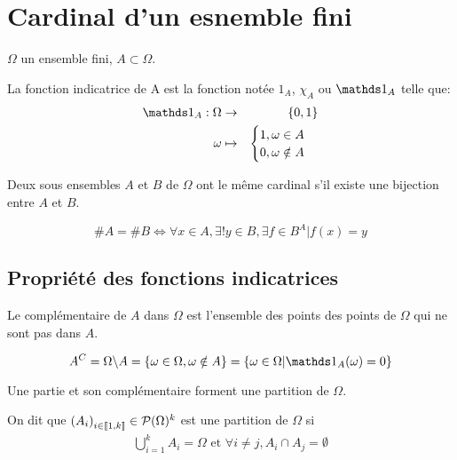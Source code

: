 \section{Cardinal d'un esnemble fini}
$\Omega$ un ensemble fini, $A\subset\Omega$.
\begin{definition}
  La fonction indicatrice de A est la fonction notée $1_A$, $\chi_A$ ou
  $\indic_A$ telle que:
  \begin{eqnarray*}
    \indic_A : \Omega &\rightarrow& \{0, 1\}\\
          \omega &\mapsto& \begin{cases}
                          1, \omega\in A\\
                          0, \omega\notin A
                        \end{cases}
  \end{eqnarray*}
\end{definition}

\begin{proposition}
  Deux sous ensembles $A$ et $B$ de $\Omega$ ont le même cardinal s'il existe
  une bijection entre $A$ et $B$.

  \[
    \# A = \# B \iff \forall x \in A,
    \exists ! y \in B, \exists f\in B^A | f(x)=y
  \]

\end{proposition}

\subsection{Propriété des fonctions indicatrices}
\label{sub:Propriété des fonctions indicatrices}
  \begin{definition}
    Le complémentaire de $A$ dans $\Omega$ est l'ensemble des points des
    points de $\Omega$ qui ne sont pas dans $A$.

    \[A^C = \Omega\backslash A = \rdbrackets{\omega\in\Omega, \omega\notin A}
                               = \rdbrackets{\omega\in\Omega|\indic_A(\omega)=0}
    \]

  \end{definition}

  Une partie et son complémentaire forment une partition de $\Omega$.

  \begin{definition}
    On dit que $\left(A_i\right)_{i\in\left\llbracket1,k\right\rrbracket}\in\mathcal{P}(\Omega)^k$
    est une partition de $\Omega$ si
    \begin{eqnarray*}
      \bigcup_{i=1}^k A_i = \Omega \text{ et }
      \forall i\neq j, A_i\cap A_j = \emptyset
    \end{eqnarray*}
  \end{definition}

